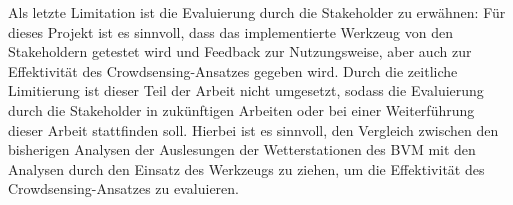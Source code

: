Als letzte Limitation ist die Evaluierung durch die Stakeholder zu erwähnen: Für dieses Projekt ist es sinnvoll, dass das implementierte Werkzeug von den Stakeholdern getestet wird und Feedback zur Nutzungsweise, aber auch zur Effektivität des Crowdsensing-Ansatzes gegeben wird. Durch die zeitliche Limitierung ist dieser Teil der Arbeit nicht umgesetzt, sodass die Evaluierung durch die Stakeholder in zukünftigen Arbeiten oder bei einer Weiterführung dieser Arbeit stattfinden soll. Hierbei ist es sinnvoll, den Vergleich zwischen den bisherigen Analysen der Auslesungen der Wetterstationen des \ac{BVM} mit den Analysen durch den Einsatz des Werkzeugs zu ziehen, um die Effektivität des Crowdsensing-Ansatzes zu evaluieren.